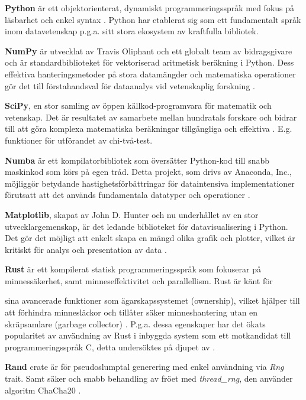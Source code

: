 \documentclass[swedish,a4paper]{article}
\begin{document}
\textbf{Python} är ett objektorienterat, dynamiskt programmeringsspråk 
med fokus på läsbarhet och enkel syntax \parencite{python}. Python
har etablerat sig som ett fundamentalt språk inom datavetenskap p.g.a. sitt
stora ekosystem av kraftfulla \gls{bibliotek}. 

\textbf{NumPy} är utvecklat av Travis Oliphant och ett globalt team av
bidragsgivare och är standardbiblioteket för vektoriserad aritmetisk beräkning i
Python. Dess effektiva hanteringsmetoder på stora datamängder och matematiska
operationer gör det till förstahandsval för dataanalys vid vetenskaplig
forskning \parencite{numpy}.

\textbf{SciPy}, en stor samling av öppen källkod-programvara för matematik och
vetenskap. Det är resultatet av samarbete mellan hundratals forskare och bidrar
till att göra komplexa matematiska beräkningar tillgängliga och effektiva
\parencite{scipy}. E.g. funktioner för utförandet av chi-två-test.

\textbf{Numba} är ett kompilatorbibliotek som översätter Python-kod till snabb maskinkod som körs på egen tråd. Detta projekt, som drivs av Anaconda, Inc.,
möjliggör betydande hastighetsförbättringar för dataintensiva implementationer 
förutsatt att det används fundamentala datatyper och operationer \parencite{numba}.  

\textbf{Matplotlib}, skapat av John D. Hunter och nu underhållet av en stor
utvecklargemenskap, är det ledande biblioteket för datavisualisering i Python.
Det gör det möjligt att enkelt skapa en mängd olika grafik och plotter, vilket
är kritiskt för analys och presentation av data \textcite{matplotlib}.

\textbf{Rust} är ett kompilerat statisk programmeringsspråk som fokuserar på
minnessäkerhet, samt minneseffektivitet och parallellism. Rust är känt för

sina avancerade funktioner som ägarskapssystemet (ownership), vilket
hjälper till att förhindra minnesläckor och tillåter säker
minneshantering utan en skräpsamlare (garbage collector)
\parencite{rust}. 
P.g.a. dessa egenskaper har det ökats popularitet av användning av Rust i
inbyggda system som ett motkandidat till programmeringsspråk C, detta  undersöktes
 på djupet av \textcite{sharma2023rust}.

\textbf{Rand} \gls{crate} är för pseudoslumptal generering med enkel användning
via \textit{Rng} trait. Samt säker och snabb behandling av fröet med
\textit{thread\_rng}, den använder algoritm ChaCha20 \parencite{rand_crate}.
\end{document}
